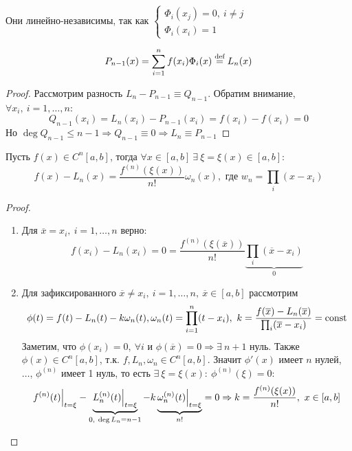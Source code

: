 Они линейно-независимы, так как
$\begin{cases}
    \Phi_i(x_j)=0,\ i\neq j \\
    \Phi_i(x_i)=1
  \end{cases}$
\begin{lemma*}
  $$P_{n-1}(x)=\sum_{i=1}^nf(x_i)\Phi_i(x)\stackrel{\text{def}}{=} L_n(x)$$
\end{lemma*}
\begin{proof}
  Рассмотрим разность $L_n-P_{n-1}\equiv Q_{n-1}$.
  Обратим внимание, $\forall x_i,\ i=1,\ldots,n$:
  $$Q_{n-1}(x_i)=L_n(x_i)-P_{n-1}(x_i)=f(x_i)-f(x_i)=0$$
  Но $\deg Q_{n-1}\leq n-1 \Rightarrow Q_{n-1}\equiv0\Rightarrow L_n\equiv P_{n-1}$
\end{proof}
\begin{theorem}
  Пусть $f(x)\in C^n[a,b]$, тогда $\forall x \in [a,b]\ \exists\ \xi=\xi(x)\in[a,b]:$
  $$f(x)-L_n(x)=\frac{f^{(n)}(\xi(x))}{n!}\omega_n(x),\text{ где } w_n=\prod_i(x-x_i)$$
\end{theorem}
\begin{proof}
  \begin{enumerate}
    \item Для $\overline{x}=x_i,\ i=1,\ldots,n$ верно:
          $$f(x_i)-L_n(x_i)=0=\frac{f^{(n)}(\xi(\overline{x}))}{n!}\underbrace{\prod_i(\overline{x}-x_i)}_{0}$$
    \item Для зафиксированного $\overline{x}\neq x_i,\ i=1,\ldots,n,\ \overline{x}\in[a,b]$ рассмотрим
          \begin{equation*}
            \phi(t)=f(t)-L_n(t)-k\omega_n(t),\\ \omega_n(t)=\prod_{i=1}^n(t-x_i),\ k=\frac{f(\overline{x})-L_n(\overline{x})}{\prod_i(\overline{x}-x_i)}=\const
          \end{equation*}
          Заметим, что $\phi(x_i)=0,\ \forall i$ и $\phi(\overline{x})=0\Rightarrow\exists\ n+1$ нуль. Также $\phi(x)\in C^n[a,b]$, т.к. $f, L_n, \omega_n\in C^n[a,b]$.
          Значит $\phi'(x)$ имеет $n$ нулей, $\ldots$, $\phi^{(n)}$ имеет 1 нуль, то есть $\exists\ \xi=\xi(x):\ \phi^{(n)}(\xi)=0$:
          \begin{equation*}
            f^{(n)}(t)\Bigr|_{t=\xi}-\underbrace{L_n^{(n)}(t)\Bigr|_{t=\xi}}_{0,\ \deg L_n=n-1}-k\underbrace{\omega_n^{(n)}(t)\Bigr|_{t=\xi}}_{n!}=0\\\Rightarrow k=\frac{f^{(n)}(\xi(x))}{n!},\ x\in[a,b]
          \end{equation*}
  \end{enumerate}
\end{proof}
